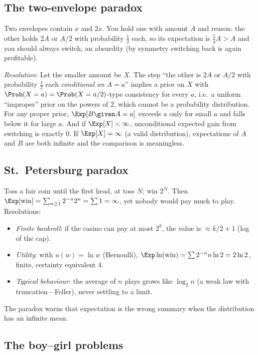 \subsection{The two-envelope paradox}

Two envelopes contain $x$ and $2x$. You hold one with amount $A$ and reason: the other holds $2A$ or $A/2$
with probability $\tfrac12$ each, so its expectation is $\tfrac54A>A$ and you should always switch, an
absurdity (by symmetry switching back is again profitable).

\textit{Resolution}: Let the smaller amount be $X$. The step ``the other is $2A$ or $A/2$ with probability $\tfrac12$
each \emph{conditional on} $A=a$'' implies a prior on $X$ with $\Prob(X=a)=\Prob(X=a/2)$-type
consistency for every $a$, i.e.\ a uniform ``improper'' prior on the powers of $2$, which cannot be a probability
distribution. For any proper prior, $\Exp[B\given A=a]$ exceeds $a$ only for small $a$ and falls below it for
large $a$. And if $\Exp[X]<\infty$, unconditional expected gain from switching is exactly $0$. If $\Exp[X]=\infty$
(a valid distribution), expectations of $A$ and $B$ are both infinite and the comparison is meaningless.

\subsection{St.\ Petersburg paradox}

Toss a fair coin until the first head, at toss $N$; win $2^N$. Then
$\Exp[\text{win}]=\sum_{n\ge1}2^{-n}2^n=\sum1=\infty$, yet nobody would pay much to play. Resolutions:
\begin{itemize}
\item \emph{Finite bankroll}: if the casino can pay at most $2^k$, the value is $\approx k/2+1$ (log of the cap).
\item \emph{Utility}: with $u(w)=\ln w$ (Bernoulli), $\Exp\ln(\text{win})=\sum2^{-n}n\ln2=2\ln2$, finite, certainty
equivalent $4$.
\item \emph{Typical behaviour}: the average of $n$ plays grows like $\log_2n$ (a weak law with truncation---Feller),
never settling to a limit.
\end{itemize}
The paradox warns that expectation is the wrong summary when the distribution has an infinite mean.

\subsection{The boy--girl problems}


